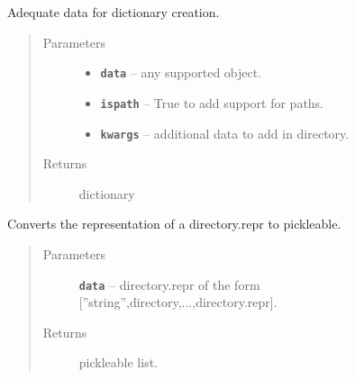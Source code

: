 \documentclass[letterpaper,10pt,english]{sphinxmanual}
\begin{document}
\begin{fulllineitems}
\begin{fulllineitems}
\begin{quote}
\begin{description}
\end{description}\end{quote}

\end{fulllineitems}


\begin{fulllineitems}
\label{RRtoolbox.lib:RRtoolbox.lib.directory.Directory.filterdata}
Adequate data for dictionary creation.
\begin{quote}\begin{description}
\item[{Parameters}] \leavevmode\begin{itemize}
\item {} 
\textbf{\texttt{data}} -- any supported object.

\item {} 
\textbf{\texttt{ispath}} -- True to add support for paths.

\item {} 
\textbf{\texttt{kwargs}} -- additional data to add in directory.

\end{itemize}

\item[{Returns}] \leavevmode
dictionary

\end{description}\end{quote}

\end{fulllineitems}


\begin{fulllineitems}
\label{RRtoolbox.lib:RRtoolbox.lib.directory.Directory.repr2list}
Converts the representation of a directory.repr to pickleable.
\begin{quote}\begin{description}
\item[{Parameters}] \leavevmode
\textbf{\texttt{data}} -- directory.repr of the form {[}''string'',directory,...,directory.repr{]}.

\item[{Returns}] \leavevmode
pickleable list.


\end{description}
\end{quote}
\end{fulllineitems}
\end{fulllineitems}
\end{document}
